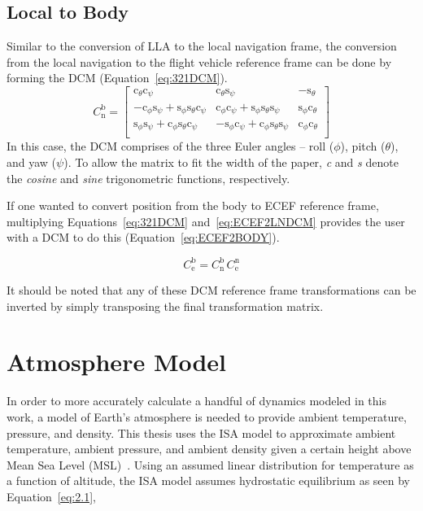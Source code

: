 \subsection{\textbf{Local to Body}}
Similar to the conversion of LLA to the local navigation frame, the conversion from the local navigation to the flight vehicle reference frame can be done by forming the DCM (Equation~\ref{eq:321DCM}).
\begin{equation}\label{eq:321DCM}
    C^{\textrm{b}}_{\textrm{n}} =
    \begin{bmatrix}
        \textrm{c}_{\theta}\textrm{c}_{\psi}                                                        & \textrm{c}_{\theta}\textrm{s}_{\psi}                                                        & -\textrm{s}_{\theta}                 \\
        -\textrm{c}_{\phi}\textrm{s}_{\psi} + \textrm{s}_{\phi}\textrm{s}_{\theta}\textrm{c}_{\psi} & \textrm{c}_{\phi}\textrm{c}_{\psi} + \textrm{s}_{\phi}\textrm{s}_{\theta}\textrm{s}_{\psi}  & \textrm{s}_{\phi}\textrm{c}_{\theta} \\
        \textrm{s}_{\phi}\textrm{s}_{\psi} + \textrm{c}_{\phi}\textrm{s}_{\theta}\textrm{c}_{\psi}  & -\textrm{s}_{\phi}\textrm{c}_{\psi} + \textrm{c}_{\phi}\textrm{s}_{\theta}\textrm{s}_{\psi} & \textrm{c}_{\phi}\textrm{c}_{\theta} \\
    \end{bmatrix}
\end{equation}
In this case, the DCM comprises of the three Euler angles {--} roll (\( \phi \)), pitch (\( \theta \)), and yaw (\( \psi \)). To allow the matrix to fit the width of the paper, \textit{c} and \textit{s} denote the \textit{cosine} and \textit{sine} trigonometric functions, respectively.

If one wanted to convert position from the body to ECEF reference frame, multiplying Equations~\ref{eq:321DCM} and~\ref{eq:ECEF2LNDCM} provides the user with a DCM to do this (Equation~\ref{eq:ECEF2BODY}).

\begin{equation}\label{eq:ECEF2BODY}
    C^{\textrm{b}}_{\textrm{e}} = C^{\textrm{b}}_{\textrm{n}} \, C^{\textrm{n}}_{\textrm{e}}
\end{equation}

It should be noted that any of these DCM reference frame transformations can be inverted by simply transposing the final transformation matrix.

\section{\textbf{Atmosphere Model}}\label{section:atmos}
In order to more accurately calculate a handful of dynamics modeled in this work, a model of Earth's atmosphere is needed to provide ambient temperature, pressure, and density. This thesis uses the ISA model to approximate ambient temperature, ambient pressure, and ambient density given a certain height above Mean Sea Level (MSL)~\cite{USStandardAtmosphere1976}. Using an assumed linear distribution for temperature as a function of altitude, the ISA model assumes hydrostatic equilibrium as seen by Equation~\ref{eq:2.1},

